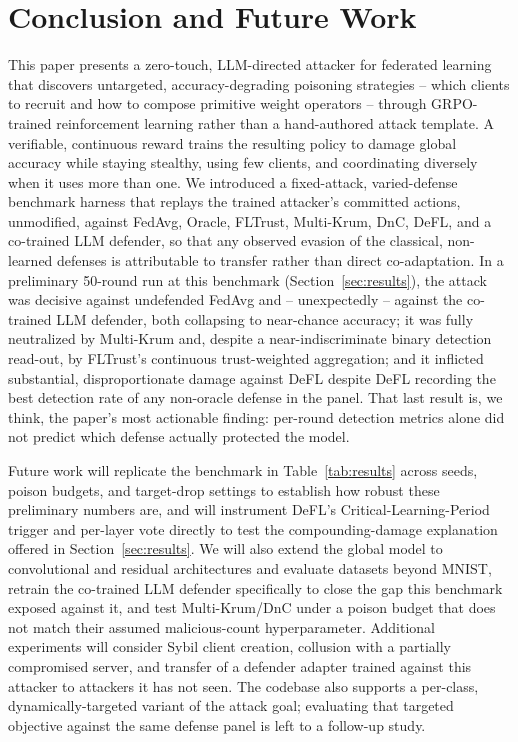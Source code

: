 \documentclass[conference]{IEEEtran}
\begin{document}
\section{Conclusion and Future Work}
\label{sec:conclusion}
This paper presents a zero-touch, LLM-directed attacker for federated learning that discovers untargeted, accuracy-degrading poisoning strategies -- which clients to recruit and how to compose primitive weight operators -- through GRPO-trained reinforcement learning rather than a hand-authored attack template. A verifiable, continuous reward trains the resulting policy to damage global accuracy while staying stealthy, using few clients, and coordinating diversely when it uses more than one. We introduced a fixed-attack, varied-defense benchmark harness that replays the trained attacker's committed actions, unmodified, against FedAvg, Oracle, FLTrust, Multi-Krum, DnC, DeFL, and a co-trained LLM defender, so that any observed evasion of the classical, non-learned defenses is attributable to transfer rather than direct co-adaptation. In a preliminary 50-round run at this benchmark (Section~\ref{sec:results}), the attack was decisive against undefended FedAvg and -- unexpectedly -- against the co-trained LLM defender, both collapsing to near-chance accuracy; it was fully neutralized by Multi-Krum and, despite a near-indiscriminate binary detection read-out, by FLTrust's continuous trust-weighted aggregation; and it inflicted substantial, disproportionate damage against DeFL despite DeFL recording the best detection rate of any non-oracle defense in the panel. That last result is, we think, the paper's most actionable finding: per-round detection metrics alone did not predict which defense actually protected the model.

Future work will replicate the benchmark in Table~\ref{tab:results} across seeds, poison budgets, and target-drop settings to establish how robust these preliminary numbers are, and will instrument DeFL's Critical-Learning-Period trigger and per-layer vote directly to test the compounding-damage explanation offered in Section~\ref{sec:results}. We will also extend the global model to convolutional and residual architectures and evaluate datasets beyond MNIST, retrain the co-trained LLM defender specifically to close the gap this benchmark exposed against it, and test Multi-Krum/DnC under a poison budget that does not match their assumed malicious-count hyperparameter. Additional experiments will consider Sybil client creation, collusion with a partially compromised server, and transfer of a defender adapter trained against this attacker to attackers it has not seen. The codebase also supports a per-class, dynamically-targeted variant of the attack goal; evaluating that targeted objective against the same defense panel is left to a follow-up study.
\end{document}
